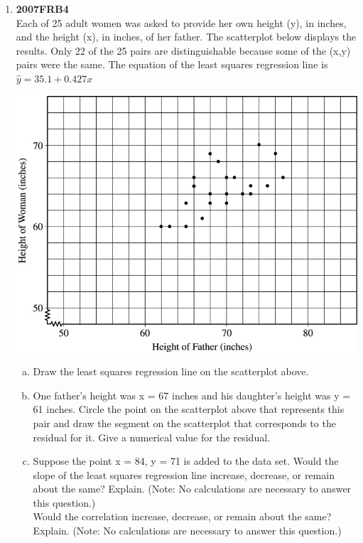 \documentclass[a4paper,12pt,twoside]{book}
\begin{document}
\begin{enumerate}
 \item \textbf{2007FRB4}\\
   Each of 25 adult women was asked to provide her own height (y), in inches, and the height (x), in inches, of her father. The scatterplot below displays the results. Only 22 of the 25 pairs are distinguishable because some of the (x,y) pairs were the same. The equation of the least squares regression line is $\hat{y}=35.1+0.427x$
   \begin{center}
   \includegraphics[scale=0.4]{2007FRB4-1.JPG}
   \end{center}
   
  \begin{enumerate}[(a), start =1]
   \item  Draw the least squares regression line on the scatterplot above.
   \item One father’s height was x = 67 inches and his daughter’s height was y = 61 inches. Circle the point on the scatterplot above that represents this pair and draw the segment on the scatterplot that corresponds to the residual for it. Give a numerical value for the residual.
   \item Suppose the point x = 84, y = 71 is added to the data set. Would the slope of the least squares regression line increase, decrease, or remain about the same? Explain. (Note: No calculations are necessary to answer this question.)\\
   Would the correlation increase, decrease, or remain about the same? Explain. (Note: No calculations are necessary to answer this question.)
  \end{enumerate}
  \newpage
  

\end{enumerate}
\end{document}
